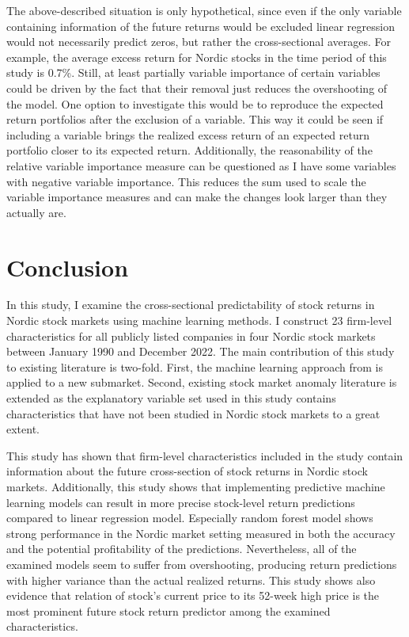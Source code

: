\documentclass[12pt]{article}
\begin{document}
The above-described situation is only hypothetical, since even if the only variable containing information of the future returns would be excluded linear regression would not necessarily predict zeros, but rather the cross-sectional averages. For example, the average excess return for Nordic stocks in the time period of this study is 0.7\%. Still, at least partially variable importance of certain variables could be driven by the fact that their removal just reduces the overshooting of the model. One option to investigate this would be to reproduce the expected return portfolios after the exclusion of a variable. This way it could be seen if including a variable brings the realized excess return of an expected return portfolio closer to its expected return. Additionally, the reasonability of the relative variable importance measure can be questioned as I have some variables with negative variable importance. This reduces the sum used to scale the variable importance measures and can make the changes look larger than they actually are. \par

\section{Conclusion}\label{Conclusion}

In this study, I examine the cross-sectional predictability of stock returns in Nordic stock markets using machine learning methods. I construct 23 firm-level characteristics for all publicly listed companies in four Nordic stock markets between January 1990 and December 2022. The main contribution of this study to existing literature is two-fold. First, the machine learning approach from \citet{guetal} is applied to a new submarket.\footnotemark {} Second, existing stock market anomaly literature is extended as the explanatory variable set used in this study contains characteristics that have not been studied in Nordic stock markets to a great extent. \par

This study has shown that firm-level characteristics included in the study contain information about the future cross-section of stock returns in Nordic stock markets. Additionally, this study shows that implementing predictive machine learning models can result in more precise stock-level return predictions compared to linear regression model. Especially random forest model shows strong performance in the Nordic market setting measured in both the accuracy and the potential profitability of the predictions. Nevertheless, all of the examined models seem to suffer from overshooting, producing return predictions with higher variance than the actual realized returns. This study shows also evidence that relation of stock's current price to its 52-week high price is the most prominent future stock return predictor among the examined characteristics. \par
\end{document}
